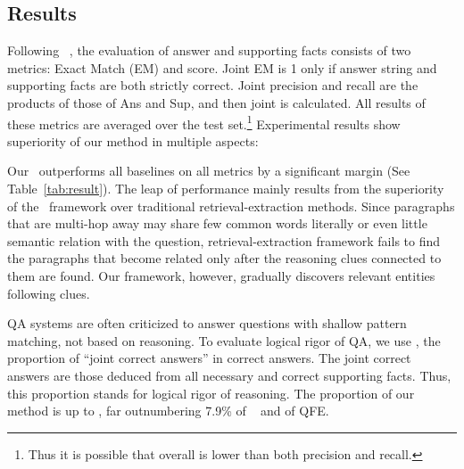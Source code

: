 \subsection{Results}
Following ~\citet{yang2018hotpotqa}, the evaluation of answer and supporting facts consists of two metrics: Exact Match (EM) and  score. Joint EM is 1 only if answer string and supporting facts are both strictly correct. Joint precision and recall are the products of those of Ans and Sup, and then joint  is calculated. All results of these metrics are averaged over the test set.\footnote{Thus it is possible that overall  is lower than both precision and recall.} Experimental results show superiority of our method in multiple aspects:

Our \name~outperforms all baselines on all metrics by a significant margin (See Table~\ref{tab:result}). The leap of performance mainly results from the superiority of the \name~framework over traditional retrieval-extraction methods. Since paragraphs that are multi-hop away may share few common words literally or even little semantic relation with the question, retrieval-extraction framework fails to find the paragraphs that become related only after the reasoning clues connected to them are found.
Our framework, however, gradually discovers relevant entities following clues.




 QA systems are often criticized to answer questions with shallow pattern matching, not based on reasoning. To evaluate logical rigor of QA, we use , the proportion of ``joint correct answers'' in correct answers. The joint correct answers are those deduced from all necessary and correct supporting facts. Thus, this proportion stands for logical rigor of reasoning. The proportion of our method is up to , far outnumbering 7.9\% of ~\citet{yang2018hotpotqa} and  of QFE. 





